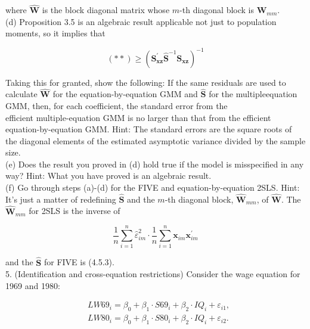 \documentclass[10pt]{article}
\begin{document}
where $\widehat{\mathbf{W}}$ is the block diagonal matrix whose $m$-th diagonal block is $\widehat{\mathbf{W}}_{m m}$.\\
(d) Proposition 3.5 is an algebraic result applicable not just to population moments, so it implies that

$$
(* *) \geq\left(\mathbf{S}_{\mathbf{x z}}^{\prime} \widehat{\mathbf{S}}^{-1} \mathbf{S}_{\mathbf{x z}}\right)^{-1}
$$

Taking this for granted, show the following: If the same residuals are used to calculate $\widehat{\mathbf{W}}$ for the equation-by-equation GMM and $\widehat{\mathbf{S}}$ for the multipleequation GMM, then, for each coefficient, the standard error from the\\
efficient multiple-equation GMM is no larger than that from the efficient equation-by-equation GMM. Hint: The standard errors are the square roots of the diagonal elements of the estimated asymptotic variance divided by the sample size.\\
(e) Does the result you proved in (d) hold true if the model is misspecified in any way? Hint: What you have proved is an algebraic result.\\
(f) Go through steps (a)-(d) for the FIVE and equation-by-equation 2SLS. Hint: It's just a matter of redefining $\widehat{\mathbf{S}}$ and the $m$-th diagonal block, $\widehat{\mathbf{W}}_{m m}$, of $\widehat{\mathbf{W}}$. The $\widehat{\mathbf{W}}_{m m}$ for 2SLS is the inverse of

$$
\frac{1}{n} \sum_{i=1}^{n} \hat{\varepsilon}_{i m}^{2} \cdot \frac{1}{n} \sum_{i=1}^{n} \mathbf{x}_{i m} \mathbf{x}_{i m}^{\prime}
$$

and the $\widehat{\mathbf{S}}$ for FIVE is (4.5.3).\\
5. (Identification and cross-equation restrictions) Consider the wage equation for 1969 and 1980:

$$
\begin{aligned}
& L W 69_{i}=\beta_{0}+\beta_{1} \cdot S 69_{i}+\beta_{2} \cdot I Q_{i}+\varepsilon_{i 1}, \\
& L W 80_{i}=\beta_{0}+\beta_{1} \cdot S 80_{i}+\beta_{2} \cdot I Q_{i}+\varepsilon_{i 2} .
\end{aligned}
$$
\end{document}
